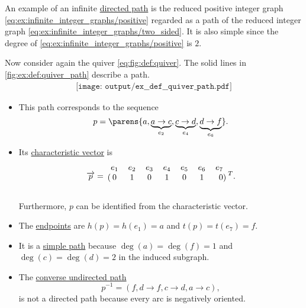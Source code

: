 \begin{example}\label{ex:def:quiver_path}
  An example of an infinite \hyperref[def:quiver_path/directed]{directed path} is the reduced positive integer graph \eqref{eq:ex:infinite_integer_graphs/positive} regarded as a path of the reduced integer graph \eqref{eq:ex:infinite_integer_graphs/two_sided}. It is also simple since the degree of \eqref{eq:ex:infinite_integer_graphs/positive} is \( 2 \).

  Now consider again the quiver \eqref{eq:fig:def:quiver}. The solid lines in \eqref{fig:ex:def:quiver_path} describe a path.
  \begin{equation}\label{fig:ex:def:quiver_path}
    \begin{aligned}
      \texttt{[image: output/ex\_\_def\_\_quiver\_path.pdf]}
    \end{aligned}
  \end{equation}

  \begin{itemize}
    \item This path corresponds to the sequence
    \begin{equation*}
      p = \parens{ a, \underbrace{a \to c}_{e_2}, \underbrace{c \to d}_{e_4}, \underbrace{d \to f}_{e_6} }.
    \end{equation*}

    \item Its \hyperref[def:undirected_multigraph_path/characteristic_vector]{characteristic vector} is
    \begin{equation*}
      \vect{p}
      =
      \begin{blockarray}{ccccccr}
        e_1 & e_2 & e_3 & e_4 & e_5 & e_6 & e_7 \\
      \begin{block}{(ccccccr)}
        0   & 1   & 0   & 1   & 0   & 1   & 0   \\
      \end{block}
      \end{blockarray}
      {}^T.
    \end{equation*}

    Furthermore, \( p \) can be identified from the characteristic vector.

    \item The \hyperref[def:quiver_path]{endpoints} are \( h(p) = h(e_1) = a \) and \( t(p) = t(e_7) = f \).

    \item It is a \hyperref[def:undirected_multigraph_path/simple]{simple path} because \( \deg(a) = \deg(f) = 1 \) and \( \deg(c) = \deg(d) = 2 \) in the induced subgraph.

    \item The \hyperref[def:undirected_multigraph_path/converse]{converse undirected path}
    \begin{equation*}
      p^{-1} = (f, d \to f, c \to d, a \to c),
    \end{equation*}
    is not a directed path because every arc is negatively oriented.
  \end{itemize}
\end{example}

